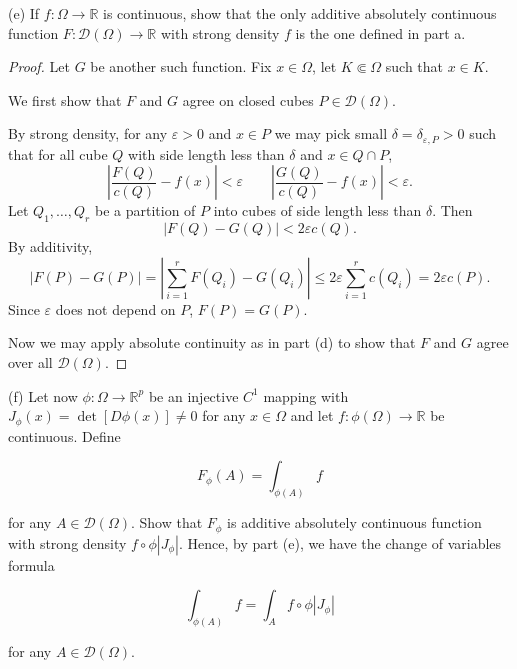 \newpage
(e) If $f: \Omega \rightarrow \mathbb{R}$ is continuous, show that the only additive absolutely continuous function $F: \mathcal{D}(\Omega) \rightarrow \mathbb{R}$ with strong density $f$ is the one defined in part a.
\begin{proof}
	Let $G $ be another such function. Fix $x \in \Omega$, let $K \Subset \Omega$ such that $x \in K$. 

	We first show that $F$ and $G$ agree on closed cubes $P \in \mathcal{D}(\Omega)$.

	By strong density, for any $\varepsilon>0$ and $x \in P$ we may pick small $\delta = \delta_{\varepsilon, P}>0$ such that for all cube $Q$ with side length less than $\delta$ and $x \in Q \cap P$,
	\[
		\left| \frac{F(Q)}{c(Q)} - f(x) \right| < \varepsilon \qquad
		\left| \frac{G(Q)}{c(Q)} - f(x) \right| < \varepsilon
	.\] 
	Let $Q_1, \ldots, Q_r$ be a partition of $P$ into cubes of side length less than $\delta$. Then 
	\[
		\left| F(Q) - G(Q) \right| < 2 \varepsilon c(Q)
	.\] 
	By additivity,
	\[
		\left| F(P) - G\left(P \right)  \right| 
		= \left| \sum_{i = 1}^r F(Q_i) - G(Q_i) \right| 
		\le 2 \varepsilon \sum_{i = 1}^r c(Q_i)
		= 2 \varepsilon c(P)
	.\] 
	Since $\varepsilon$ does not depend on $P$, $F(P) = G(P)$.

	Now we may apply absolute continuity as in part (d) to show that $F$ and  $G$ agree over all $\mathcal{D}(\Omega)$.
\end{proof}


\newpage
(f) Let now $\phi: \Omega \rightarrow \mathbb{R}^{p}$ be an injective $C^{1}$ mapping with $J_{\phi}(x)=\operatorname{det}[D \phi(x)] \neq 0$ for any $x \in \Omega$ and let $f: \phi(\Omega) \rightarrow \mathbb{R}$ be continuous. Define

$$
F_{\phi}(A)=\int_{\phi(A)} f
$$

for any $A \in \mathcal{D}(\Omega)$. Show that $F_{\phi}$ is additive absolutely continuous function with strong density $f \circ \phi\left|J_{\phi}\right|$. Hence, by part (e), we have the change of variables formula

$$
\int_{\phi(A)} f=\int_{A} f \circ \phi\left|J_{\phi}\right|
$$

for any $A \in \mathcal{D}(\Omega)$.

